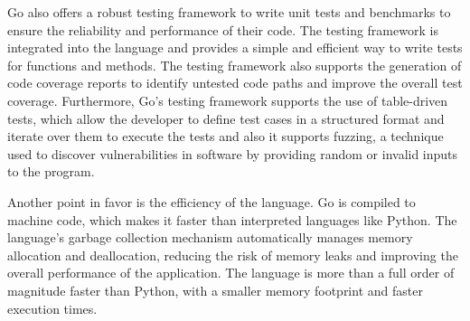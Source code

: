 Go also offers a robust testing framework to write unit tests and benchmarks to ensure the reliability and performance of their code. The testing framework is integrated into the language and provides a simple and efficient way to write tests for functions and methods. The testing framework also supports the generation of code coverage reports to identify untested code paths and improve the overall test coverage. Furthermore, Go's testing framework supports the use of table-driven tests, which allow the developer to define test cases in a structured format and iterate over them to execute the tests and also it supports fuzzing, a technique used to discover vulnerabilities in software by providing random or invalid inputs to the program.

Another point in favor is the efficiency of the language. Go is compiled to machine code, which makes it faster than interpreted languages like Python. The language's garbage collection mechanism automatically manages memory allocation and deallocation, reducing the risk of memory leaks and improving the overall performance of the application. The language is more than a full order of magnitude faster than Python, with a smaller memory footprint and faster execution times.~\cite{go-lang-performance}



